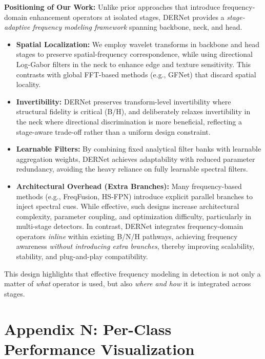 \documentclass{article}
\theoremstyle{plain}
\theoremstyle{definition}
\theoremstyle{remark}
\begin{document}
  \noindent\textbf{Positioning of Our Work:}
  Unlike prior approaches that introduce frequency-domain enhancement operators at isolated stages,
  DERNet provides a \emph{stage-adaptive frequency modeling framework} spanning backbone, neck, and head.
  
  \begin{itemize}
  \item \textbf{Spatial Localization:}
  We employ wavelet transforms in backbone and head stages to preserve spatial-frequency correspondence,
  while using directional Log-Gabor filters in the neck to enhance edge and texture sensitivity.
  This contrasts with global FFT-based methods (e.g., GFNet) that discard spatial locality.
  
  \item \textbf{Invertibility:}
  DERNet preserves transform-level invertibility where structural fidelity is critical (B/H),
  and deliberately relaxes invertibility in the neck where directional discrimination is more beneficial,
  reflecting a stage-aware trade-off rather than a uniform design constraint.
  
  \item \textbf{Learnable Filters:}
  By combining fixed analytical filter banks with learnable aggregation weights,
  DERNet achieves adaptability with reduced parameter redundancy,
  avoiding the heavy reliance on fully learnable spectral filters.
  
  \item \textbf{Architectural Overhead (Extra Branches):}
  Many frequency-based methods (e.g., FreqFusion, HS-FPN) introduce explicit parallel branches to inject spectral cues.
  While effective, such designs increase architectural complexity, parameter coupling,
  and optimization difficulty, particularly in multi-stage detectors.
  In contrast, DERNet integrates frequency-domain operators \emph{inline} within existing B/N/H pathways,
  achieving frequency awareness \emph{without introducing extra branches},
  thereby improving scalability, stability, and plug-and-play compatibility.
  \end{itemize}
  
  This design highlights that effective frequency modeling in detection is not only a matter of \emph{what} operator is used,
  but also \emph{where and how} it is integrated across stages.


  \clearpage
\section{Appendix N: Per-Class Performance Visualization}
\label{sec:appendix_j_perclass}
\end{document}
